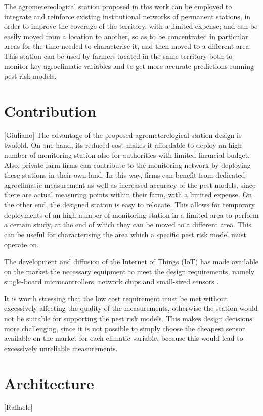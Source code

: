 \documentclass[authoryear,preprint,review,12pt]{elsarticle}
\begin{document}
The agrometereological station  proposed in this work can be employed to integrate and reinforce existing institutional networks of permanent stations, in order to improve the coverage of the territory, with a limited expense; and can be easily moved from a location to another, so as to be concentrated in particular areas for the time needed to characterise it, and then moved to a different area.
This station can be used by farmers located in the same territory both to monitor key agroclimatic variables and to get more accurate predictions running pest risk models.

\section{Contribution}[Giuliano]
The advantage of the proposed agrometerelogical station design is twofold. On one hand, its reduced cost makes it affordable to deploy an high number of monitoring station also for authorities with limited financial budget. 
Also, private farm firms can contribute to the monitoring network by deploying these stations in their own land. In this way, firms can benefit from dedicated agroclimatic measurement as well as increased accuracy of the pest models, since there are actual measuring points within their farm, with a limited expense. On the other end, the designed station is easy to relocate.
This allows for temporary deployments of an high number of monitoring station in a limited area to perform a certain study, at the end of which they can be moved to a different area. This can be useful for characterising the area which a specific pest risk model must operate on.

The development and diffusion of the Internet of Things (IoT) has made available on the market the necessary equipment to meet the design requirements, namely single-board microcontrollers, network chips and small-sized sensors \cite{singh:iot-devices}.

It is worth stressing that the low cost requirement must be met without excessively affecting the quality of the measurements, otherwise the station would not be suitable for supporting the pest risk models. This makes design decisions more challenging, since it is not possible to simply choose the cheapest sensor available on the market for each climatic variable, because this would lead to excessively unreliable measurements.

\section{Architecture}[Raffaele]
\end{document}

